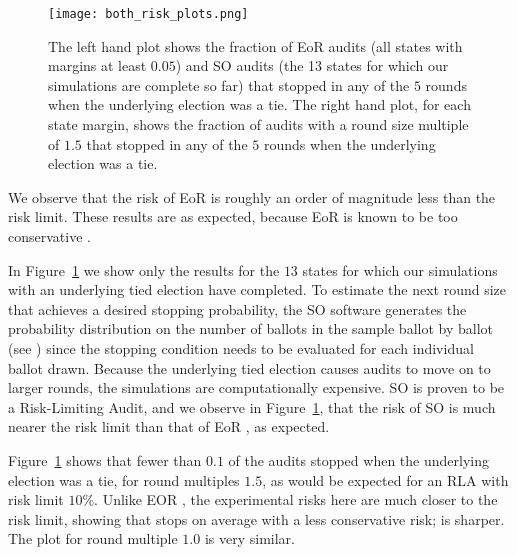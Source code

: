 \begin{figure}
\texttt{[image: both\_risk\_plots.png]}
\caption{The left hand plot shows the fraction of EoR \BRAVO audits (all states with margins at least $0.05$) and SO \BRAVO audits (the 13 states for which our simulations are complete so far) that stopped in any of the $5$ rounds when the underlying election was a tie. The right hand plot, for each state margin, shows the fraction of \Minerva audits with a round size multiple of $1.5$ that stopped in any of the $5$ rounds when the underlying election was a tie.}
\label{fig:risk}
\end{figure}
%

We observe that the risk of EoR \BRAVO is roughly
an order of magnitude less than the risk limit. 
These results are as expected, because EoR \BRAVO is known to be too conservative \cite{usenix_minerva}.  

In Figure~\ref{fig:risk} we show only the results for the $13$
states for which our simulations with an underlying tied election have completed.
To estimate the next round size that achieves a desired stopping probability,
the SO \BRAVO software generates the probability distribution on the number of ballots in the sample ballot by ballot (see \cite{usenix_minerva}) since
the stopping condition needs to be evaluated for each individual ballot drawn.
Because the underlying tied election causes audits to move on to larger rounds, 
the simulations are computationally expensive. SO \BRAVO is proven to be a Risk-Limiting Audit,
and we observe in Figure~\ref{fig:risk},
that the risk of SO \BRAVO is much
nearer the risk limit than that of EoR \BRAVO, as expected. 



Figure~\ref{fig:risk} shows that fewer than $0.1$ of the audits stopped when the underlying election was a tie, for round multiples $1.5$, as would be expected for an RLA with risk limit $10\%$. 
Unlike EOR \BRAVO, the experimental risks here are much closer to the risk limit,
showing that \Minerva stops on average with a less conservative risk; \Minerva is sharper. The plot for round multiple $1.0$ is very similar. 

